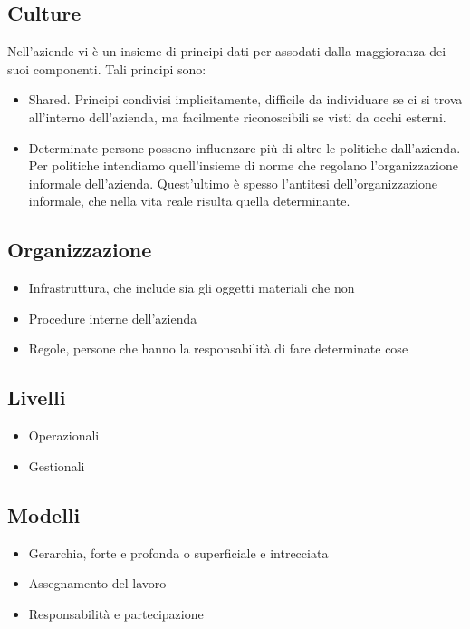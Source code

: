 \subsection{Culture}
Nell'aziende vi \`e un insieme di principi dati per assodati dalla maggioranza dei suoi componenti. Tali principi sono:
\begin{itemize}
\item Shared. Principi condivisi implicitamente, difficile da individuare se ci si trova all'interno dell'azienda, ma facilmente riconoscibili se visti da occhi esterni.
\item Determinate persone possono influenzare pi\`u di altre le politiche dall'azienda. Per politiche intendiamo quell'insieme di norme che regolano l'organizzazione informale dell'azienda. 
Quest'ultimo \`e spesso l'antitesi dell'organizzazione informale, che nella vita reale risulta quella determinante.
\end{itemize}
\subsection{Organizzazione}
\begin{itemize}
	\item Infrastruttura, che include sia gli oggetti materiali che non
	\item Procedure interne dell'azienda
	\item Regole, persone che hanno la responsabilit\`a di fare determinate cose
\end{itemize}
\subsection{Livelli}
\begin{itemize}
	\item Operazionali
	\item Gestionali
\end{itemize}
\subsection{Modelli}
\begin{itemize}
	\item Gerarchia, forte e profonda o superficiale e intrecciata
	\item Assegnamento del lavoro
	\item Responsabilit\`a e partecipazione
\end{itemize}
